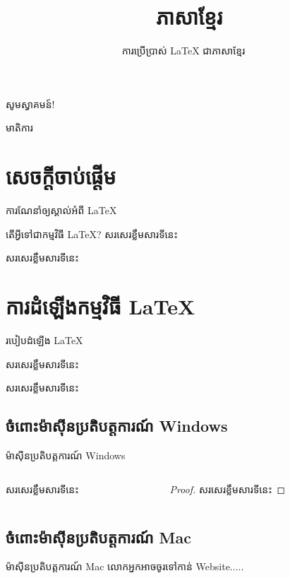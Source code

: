 \documentclass{beamer}
\title{\LaTeXe\ ភាសាខ្មែរ}
\author[តិចណូ]{ការប្រើប្រាស់ \LaTeX{} ជាភាសាខ្មែរ}
\institute{វិទ្យាស្ថានបច្ចេកវិទ្យាកម្ពុជា}
\begin{document}
	\begin{frame}{សូមស្វាគមន៍!}
		\titlepage
	\end{frame}
	\begin{frame}{មាតិការ}
		\tableofcontents
	\end{frame}
	\section{សេចក្តីចាប់ផ្ដើម}
	\begin{frame}{ការណែនាំឲ្យស្គាល់អំពី \LaTeX{}}
		\begin{block}{តើអ្វីទៅជាកម្មវិធី \LaTeX{}?}
		សរសេរខ្លឹមសារទីនេះ
		\end{block}
		\begin{block}{}
		សរសេរខ្លឹមសារទីនេះ
		\end{block}
\end{frame}
%
	\section{ការដំឡើងកម្មវិធី \LaTeX{}}
	\begin{frame}{របៀបដំឡើង \LaTeX{}}
		\begin{definition}[កម្មវិធី \LaTeX{}]
			សរសេរខ្លឹមសារទីនេះ
		\end{definition}
		\begin{example}[ការណែនាំ]
		សរសេរខ្លឹមសារទីនេះ
		\end{example}
	\end{frame}
		\subsection{ចំពោះម៉ាស៊ីនប្រតិបត្តការណ៍ Windows}
		\begin{frame}{ម៉ាស៊ីនប្រតិបត្តការណ៍ Windows}
			\begin{columns}
				\begin{column}{0.47\textwidth}
					\begin{theorem}
						សរសេរខ្លឹមសារទីនេះ
					\end{theorem}
				\end{column}
				\begin{column}{0.47\textwidth}
					\begin{proof}
						សរសេរខ្លឹមសារទីនេះ
					\end{proof}
				\end{column}
			\end{columns}
		\end{frame}
	\subsection{ចំពោះម៉ាស៊ីនប្រតិបត្តការណ៍ Mac}
		\begin{frame}{ម៉ាស៊ីនប្រតិបត្តការណ៍ Mac}
			លោកអ្នកអាចចូរទៅកាន់ Website​.....
		\end{frame}
\end{document}
